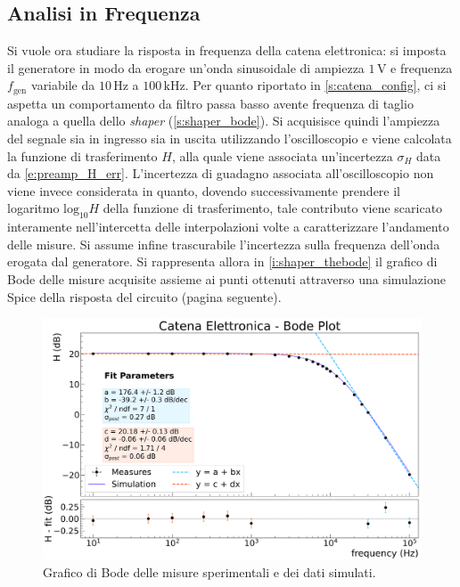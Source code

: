 \documentclass[a4paper,11pt]{article} %
\begin{document}


\subsection{Analisi in Frequenza}\label{s:catena_bode}

Si vuole ora studiare la risposta in frequenza della catena elettronica: si imposta il generatore in modo da erogare
un'onda sinusoidale di ampiezza $1\,\si{\volt}$ e frequenza $f_{\text{gen}}$ variabile da $10\,\si{\Hz}$ a
$100\,\si{\kilo\Hz}$. Per quanto riportato in \autoref{s:catena_config}, ci si aspetta un comportamento da filtro passa basso
avente frequenza di taglio analoga a quella dello \textit{shaper} (\autoref{s:shaper_bode}). Si acquisisce quindi
l'ampiezza del segnale sia in ingresso sia in uscita utilizzando l'oscilloscopio e viene calcolata la funzione di
trasferimento $H$, alla quale viene associata un'incertezza $\sigma_{H}$ data da \autoref{e:preamp_H_err}. L'incertezza
di guadagno associata all'oscilloscopio non viene invece considerata in quanto, dovendo successivamente prendere il
logaritmo $\text{log}_{10}H$ della funzione di trasferimento, tale contributo viene scaricato interamente
nell'intercetta delle interpolazioni volte a caratterizzare l'andamento delle misure. Si assume infine trascurabile
l'incertezza sulla frequenza dell'onda erogata dal generatore. Si rappresenta allora in \autoref{i:shaper_thebode} il
grafico di Bode delle misure acquisite assieme ai punti ottenuti attraverso una simulazione Spice della risposta del
circuito (pagina seguente).



\begin{figure}[H]
	\centering
	\includegraphics[width=0.9\linewidth]{../Plots/Catena/bode_plot.png}
	\caption{\small Grafico di Bode delle misure sperimentali e dei dati simulati.}
	\label{i:catena_thebode}
\end{figure}



\end{document}

